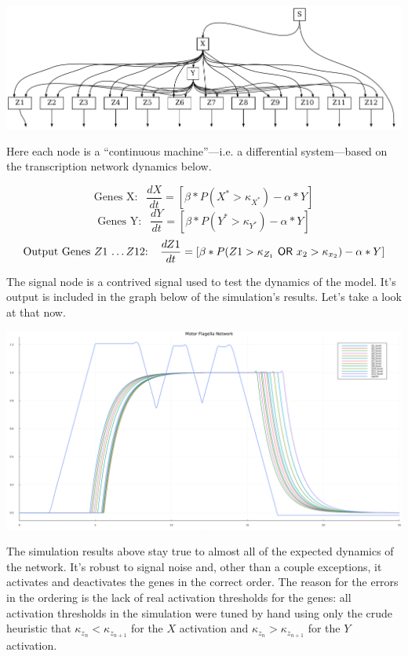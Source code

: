 \documentclass[12pt]{article}
\begin{document}
\begin{center}
    \includegraphics*[scale=0.5]{motor_flagella_network.png}
\end{center}

Here each node is a ``continuous machine''---i.e. a differential system---based on the transcription network dynamics below.

$$\text{Genes X: } \ \ \frac{dX}{dt} = [\beta*P(X^* > \kappa_{X^*}) - \alpha * Y]$$
$$\text{Genes Y: } \ \ \frac{dY}{dt} = [\beta*P(Y^* > \kappa_{Y^*}) - \alpha * Y]$$
$$\text{Output Genes $Z1$ \dots $Z12$: } \ \ \frac{dZ1}{dt} = [\beta*P(Z1 > \kappa_{Z_1} \ \mathsf{OR} \ x_2 > \kappa_{x_2}) - \alpha * Y]$$

The signal node is a contrived signal used to test the dynamics of the model.
It's output is included in the graph below of the simulation's results.
Let's take a look at that now.

\begin{center}
    \includegraphics*[scale=0.25]{motor_flagella.png}
\end{center}

The simulation results above stay true to almost all of the expected dynamics of the network.
It's robust to signal noise and, other than a couple exceptions, it activates and deactivates the genes in the correct order.
The reason for the errors in the ordering is the lack of real activation thresholds for the genes: all activation thresholds in the simulation were tuned by hand using only the crude heuristic that $\kappa_{z_n} < \kappa_{z_{n+1}}$ for the $X$ activation and $\kappa_{z_n} > \kappa_{z_{n+1}}$ for the $Y$ activation.
\end{document}
